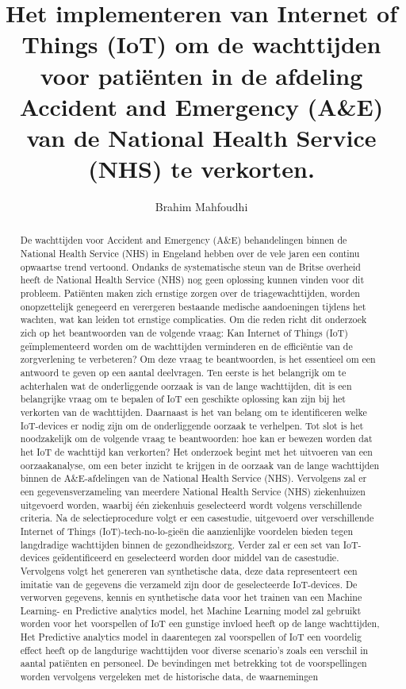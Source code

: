 \documentclass{hogent-article}
\title{Het implementeren van Internet of Things (IoT) om de wachttijden voor patiënten in de afdeling Accident and Emergency (A\&E) van de National Health Service (NHS) te verkorten.}
\author{Brahim Mahfoudhi}
\begin{document}
\begin{abstract}
De wachttijden voor Accident and Emergency (A\&E) behandelingen binnen de National Health Service (NHS) in Engeland hebben over de vele jaren een continu opwaartse trend vertoond. Ondanks de systematische steun van de Britse overheid heeft de National Health Service (NHS) nog geen oplossing kunnen vinden voor dit probleem. Patiënten maken zich ernstige zorgen over de triagewachttijden, worden onopzettelijk genegeerd en verergeren bestaande medische aandoeningen tijdens het wachten, wat kan leiden tot ernstige complicaties. Om die reden richt dit onderzoek zich op het beantwoorden van de volgende vraag: Kan Internet of Things (IoT) geïmplementeerd worden om de wachttijden verminderen en de efficiëntie van de zorgverlening te verbeteren? Om deze vraag te beantwoorden, is het essentieel om een antwoord te geven op een aantal deelvragen. Ten eerste is het belangrijk om te achterhalen wat de onderliggende oorzaak is van de lange wachttijden, dit is een belangrijke vraag om te bepalen of IoT een geschikte oplossing kan zijn bij het verkorten van de wachttijden. Daarnaast is het van belang om te identificeren welke IoT-devices er nodig zijn om de onderliggende oorzaak te verhelpen. Tot slot is het noodzakelijk om de volgende vraag te beantwoorden: hoe kan er bewezen worden dat het IoT de wachttijd kan verkorten? Het onderzoek begint met het uitvoeren van een oorzaakanalyse, om een beter inzicht te krijgen in de oorzaak van de lange wachttijden binnen de A\&E-afdelingen van de National Health Service (NHS). Vervolgens zal er een gegevensverzameling van meerdere National Health Service (NHS) ziekenhuizen uitgevoerd worden, waarbij één ziekenhuis geselecteerd wordt volgens verschillende criteria. Na de selectieprocedure volgt er een casestudie, uitgevoerd over verschillende Internet of Things (IoT)-tech-no-lo-gieën die aanzienlijke voordelen bieden tegen langdradige wachttijden binnen de gezondheidszorg. Verder zal er een set van IoT-devices geïdentificeerd en geselecteerd worden door middel van de casestudie. Vervolgens volgt het genereren van synthetische data, deze data representeert een imitatie van de gegevens die verzameld zijn door de geselecteerde IoT-devices. De verworven gegevens, kennis en synthetische data voor het trainen van een Machine Learning- en Predictive analytics model, het Machine Learning model zal gebruikt worden voor het voorspellen of IoT een gunstige invloed heeft op de lange wachttijden, Het Predictive analytics model in daarentegen zal voorspellen of IoT een voordelig effect heeft op de langdurige wachttijden voor diverse scenario’s zoals een verschil in aantal patiënten en personeel. De bevindingen met betrekking tot de voorspellingen worden vervolgens vergeleken met de historische data, de waarnemingen 
\end{abstract}
\end{document}
